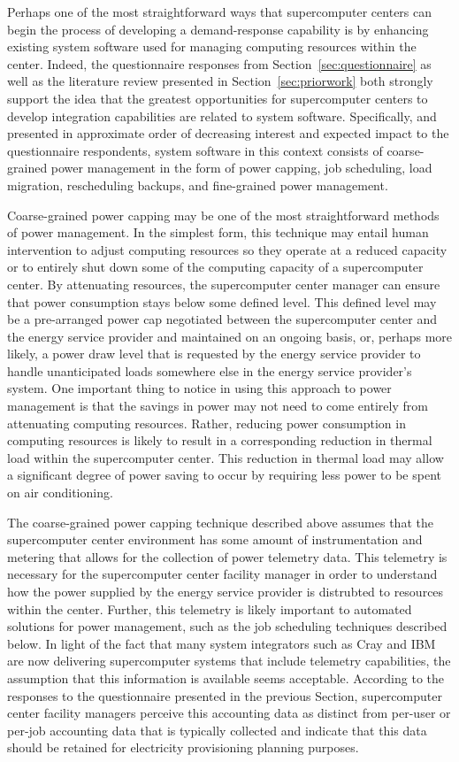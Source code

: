 Perhaps one of the most straightforward ways that supercomputer
centers can begin the process of developing a demand-response
capability is by enhancing existing system software used for managing
computing resources within the center.  Indeed, the questionnaire
responses from Section~\ref{sec:questionnaire} as well as the literature
review presented in Section~\ref{sec:priorwork} both strongly support the
idea that the greatest opportunities for supercomputer centers to
develop integration capabilities are related to system software.
Specifically, and presented in approximate order of decreasing
interest and expected impact to the questionnaire respondents, system
software in this context consists of coarse-grained power management
in the form of power capping, job scheduling, load migration,
rescheduling backups, and fine-grained power management.

Coarse-grained power capping may be one of the most straightforward
methods of power management.  In the simplest form, this technique may
entail human intervention to adjust computing resources so they
operate at a reduced capacity or to entirely shut down some of the
computing capacity of a supercomputer center.  By attenuating
resources, the supercomputer center manager can ensure that power
consumption stays below some defined level.  This defined level may be
a pre-arranged power cap negotiated between the supercomputer center
and the energy service provider and maintained on an ongoing basis,
or, perhaps more likely, a power draw level that is requested by the
energy service provider to handle unanticipated loads somewhere else
in the energy service provider's system.  One important thing to
notice in using this approach to power management is that the savings
in power may not need to come entirely from attenuating computing
resources.  Rather, reducing power consumption in computing resources
is likely to result in a corresponding reduction in thermal load
within the supercomputer center.  This reduction in thermal load
may allow a significant degree of power saving to occur by requiring
less power to be spent on air conditioning.

The coarse-grained power capping technique described above assumes
that the supercomputer center environment has some amount of
instrumentation and metering that allows for the collection of power
telemetry data.  This telemetry is necessary for the supercomputer
center facility manager in order to understand how the power supplied
by the energy service provider is distrubted to resources within the
center.  Further, this telemetry is likely important to automated
solutions for power management, such as the job scheduling techniques
described below.  In light of the fact that many system integrators
such as Cray and IBM are now delivering supercomputer systems that
include telemetry capabilities, the assumption that this information
is available seems acceptable.  According to the responses to the
questionnaire presented in the previous Section, supercomputer center
facility managers perceive this accounting data as distinct from
per-user or per-job accounting data that is typically collected and
indicate that this data should be retained for electricity
provisioning planning purposes.

